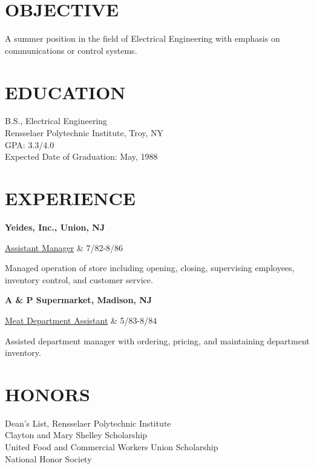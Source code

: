 \begin{resume}
 
\section{OBJECTIVE}  
     A summer position in the field of Electrical 
                Engineering with emphasis on communications or 
                control systems. 
 
\section{EDUCATION}       B.S., Electrical Engineering  \\
                Rensselaer Polytechnic Institute, Troy, NY \\ 
                GPA: 3.3/4.0 \\
                Expected Date of Graduation: May, 1988 
 
 
\section{EXPERIENCE}      {\bf Yeides, Inc., Union, NJ} \\
                \begin{ncolumn}{2} %
                \underline{Assistant Manager}     &      7/82-8/86 
                \end{ncolumn}

                Managed operation of store including opening, 
                closing, supervising employees, inventory 
                control, and customer service. 
 
                {\bf A \& P Supermarket, Madison, NJ} \\ 
                \begin{ncolumn}{2} %
                \underline{Meat Department Assistant} &   5/83-8/84 
                \end{ncolumn}

                Assisted department manager with ordering, 
                pricing, and maintaining department inventory. 
 
 
\section{HONORS}          Dean's List, Rensselaer Polytechnic Institute \\
                Clayton and Mary Shelley Scholarship \\
                United Food and Commercial Workers Union Scholarship \\
                National Honor Society 
 

\end{resume}
